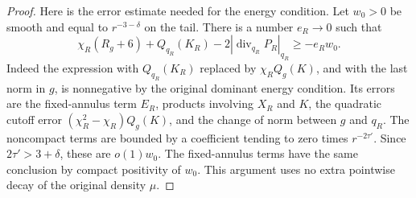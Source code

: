 \begin{proof}
Here is the error estimate needed for the energy condition.  Let
\(w_0>0\) be smooth and equal to \(r^{-3-\delta}\) on the tail.
There is a number \(e_R\to0\) such that
\begin{equation}\label{eq:ah-cutoff-dec}
 \chi_R(R_g+6)+Q_{q_R}(K_R)
       -2|\operatorname{div}_{q_R}P_R|_{q_R}
 \ge -e_Rw_0 .
\end{equation}
Indeed the expression with \(Q_{q_R}(K_R)\) replaced by
\(\chi_RQ_g(K)\), and with the last norm in \(g\), is nonnegative
by the original dominant energy condition.  Its errors are the
fixed-annulus term \(E_R\), products involving \(X_R\) and \(K\),
the quadratic cutoff error \((\chi_R^2-\chi_R)Q_g(K)\), and the
change of norm between \(g\) and \(q_R\).  The noncompact terms
are bounded by a coefficient tending to zero times
\(r^{-2\tau'}\).  Since \(2\tau'>3+\delta\), these are
\(o(1)w_0\).  The fixed-annulus terms have the same conclusion by
compact positivity of \(w_0\).  This argument uses no extra
pointwise decay of the original density \(\mu\).


\end{proof}
